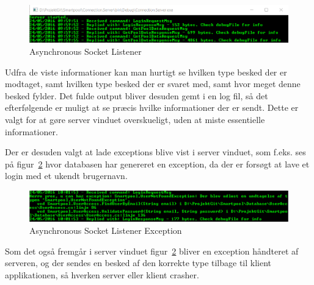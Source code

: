 \begin{figure}
\centering
\includegraphics[width=0.9\linewidth]{figs/connection/asynchronousSocketListener.png}
\caption{Asynchronous Socket Listener}
\label{fig:asynchronousSocketListener}
\end{figure}
	
Udfra de viste informationer kan man hurtigt se hvilken type besked der er modtaget, samt hvilken type besked der er svaret med, samt hvor meget denne besked fylder. Det fulde output bliver desuden gemt i en log fil, så det efterfølgende er muligt at se præcis hvilke informationer der er sendt. Dette er valgt for at gøre server vinduet overskueligt, uden at miste essentielle informationer.

Der er desuden valgt at lade exceptions blive vist i server vinduet, som f.eks. ses på figur~\ref{fig:asynchronousSocketListenerException} hvor databasen har genereret en exception, da der er forsøgt at lave et login med et ukendt brugernavn.

\begin{figure}
\centering
\includegraphics[width=0.9\linewidth]{figs/connection/asynchronousSocketListenerException.png}
\caption{Asynchronous Socket Listener Exception}
\label{fig:asynchronousSocketListenerException}
\end{figure}

Som det også fremgår i server vinduet figur~\ref{fig:asynchronousSocketListenerException} bliver en exception håndteret af serveren, og der sendes en besked af den korrekte type tilbage til klient applikationen, så hverken server eller klient crasher.

